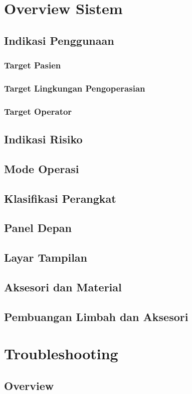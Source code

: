 \documentclass[11pt,a4paper,twoside,draft,onecolumn]{book}
\begin{document}
	\chapter{Overview Sistem}
		\section{Indikasi Penggunaan}
			\subsection{Target Pasien}
			\subsection{Target Lingkungan Pengoperasian}
			\subsection{Target Operator}
		\section{Indikasi Risiko}
		\section{Mode Operasi}
		\section{Klasifikasi Perangkat}
		\section{Panel Depan}
		\section{Layar Tampilan}
		\section{Aksesori dan Material}
		\section{Pembuangan Limbah dan Aksesori}
	\newpage
	
	\chapter{Troubleshooting}
		\section{Overview}
\end{document}
